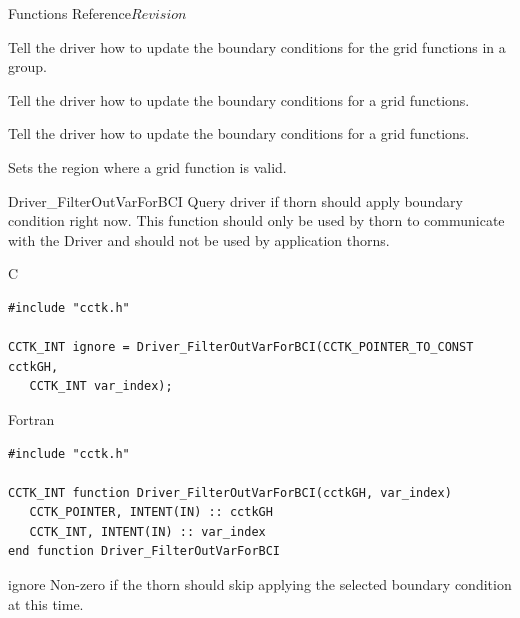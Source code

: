 \begin{cactuspart}{ Functions Reference}{}{$Revision$}
\begin{Lentry}
\item[\code{Driver\_SelectGroupForBCI}] [\pageref{Driver-SelectGroupForBCI}]
Tell the driver how to update the boundary conditions for the grid functions in a group.

\item[\code{Driver\_SelectVarForBC}] [\pageref{Driver-SelectVarForBC}]
Tell the driver how to update the boundary conditions for a grid functions.

\item[\code{Driver\_SelectVarForBCI}] [\pageref{Driver-SelectVarForBCI}]
Tell the driver how to update the boundary conditions for a grid functions.

\item[\code{Driver\_SetValidRegion}] [\pageref{Driver-SetValidRegion}]
Sets the region where a grid function is valid.

\end{Lentry}

\begin{FunctionDescription}{Driver\_FilterOutVarForBCI}
\label{Driver-FilterOutVarForBCI}
Query driver if  thorn should apply boundary condition right
now. This function should only be used by thorn  to communicate
with the Driver and should not be used by application thorns.
\begin{SynopsisSection}
\begin{Synopsis}{C}
\begin{verbatim}
#include "cctk.h"

CCTK_INT ignore = Driver_FilterOutVarForBCI(CCTK_POINTER_TO_CONST cctkGH,
   CCTK_INT var_index);

\end{verbatim}
\end{Synopsis}
\begin{Synopsis}{Fortran}
\begin{verbatim}
#include "cctk.h"

CCTK_INT function Driver_FilterOutVarForBCI(cctkGH, var_index)
   CCTK_POINTER, INTENT(IN) :: cctkGH
   CCTK_INT, INTENT(IN) :: var_index
end function Driver_FilterOutVarForBCI
\end{verbatim}
\end{Synopsis}
\end{SynopsisSection}

\begin{ResultSection}
\begin{Result}{ignore}
Non-zero if the  thorn should skip applying the selected
boundary condition at this time.
\end{Result}
\end{ResultSection}


\end{FunctionDescription}
\end{cactuspart}
